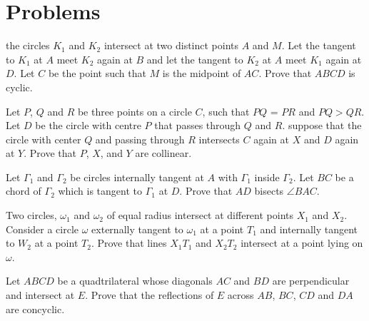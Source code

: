 \documentclass{scrartcl}
\author{Brian and Celestia}
\begin{document}
\section{Problems}
\begin{problem}
the circles $K_1$ and $K_2$ intersect at two distinct points $A$ and $M$. Let the tangent to $K_1$ at $A$ meet $K_2$ again at $B$ and let the tangent to $K_2$ at $A$ meet $K_1$ again at $D$. Let $C$ be the point such that $M$ is the midpoint of $AC$. Prove that $ABCD$ is cyclic. 
\end{problem}
\begin{problem}
Let $P$, $Q$ and $R$ be three points on a circle $C$, such that $PQ$ = $PR$ and $PQ > QR$. Let $D$ be the circle with centre $P$ that passes through $Q$ and $R$. suppose that the circle with center $Q$ and passing through $R$ intersects $C$ again at $X$ and $D$ again at $Y$. Prove that $P$, $X$, and $Y$ are collinear. 
\end{problem}
\begin{problem}
Let $\Gamma_1$ and $\Gamma_2$ be circles internally tangent at $A$ with $\Gamma_1$ inside $\Gamma_2$. Let $BC$ be a chord of $\Gamma_2$ which is tangent to $\Gamma_1$ at $D$. Prove that $AD$ bisects $\angle BAC$. 
\end{problem}
\begin{problem}
Two circles, $\omega_1$ and $\omega_2$ of equal radius intersect at different points $X_1$ and $X_2$. Consider a circle $\omega$ externally tangent to $\omega_1$ at a point $T_1$ and internally tangent to $W_2$ at a point $T_2$. Prove that lines $X_1T_1$ and $X_2T_2$ intersect at a point lying on $\omega$. 
\end{problem}
\begin{problem}
Let $ABCD$ be a quadtrilateral whose diagonals $AC$ and $BD$ are perpendicular and intersect at $E$. Prove that the reflections of $E$ across $AB$, $BC$, $CD$ and $DA$ are concyclic.
\end{problem}
\end{document}
